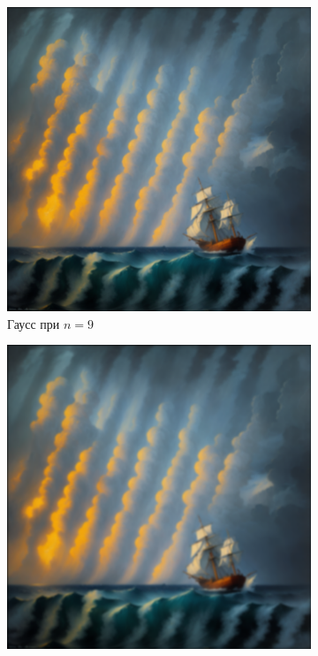 \documentclass[a4paper, 12pt]{article}
\begin{document}
    \begin{figure}[H]
        \centering
        \begin{subfigure}{0.30\textwidth}
            \centering
            \includegraphics[width=\linewidth]{g_c2_n=9.png}
            \caption{Гаусс при $n=9$}
            \label{fig:g_c2_n=9}
        \end{subfigure}
        \begin{subfigure}{0.30\textwidth}
            \centering
            \includegraphics[width=\linewidth]{g_c2_n=13.png}

\end{subfigure}
\end{figure}
\end{document}
